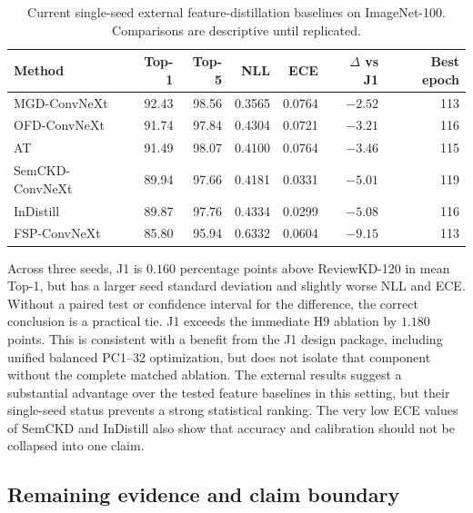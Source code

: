 \begin{table}[H]
\centering
\caption{Current single-seed external feature-distillation baselines on
ImageNet-100. Comparisons are descriptive until replicated.}
\label{tab:j1-external}
\small
\begin{tabular}{lrrrrrr}
\toprule
Method & Top-1 & Top-5 & NLL & ECE & $\Delta$ vs J1 & Best epoch\\
\midrule
MGD-ConvNeXt    & 92.43 & 98.56 & 0.3565 & 0.0764 & $-2.52$ & 113\\
\midrule
OFD-ConvNeXt    & 91.74 & 97.84 & 0.4304 & 0.0721 & $-3.21$ & 116\\
\midrule
AT              & 91.49 & 98.07 & 0.4100 & 0.0764 & $-3.46$ & 115\\
\midrule
SemCKD-ConvNeXt & 89.94 & 97.66 & 0.4181 & 0.0331 & $-5.01$ & 119\\
\midrule
InDistill       & 89.87 & 97.76 & 0.4334 & 0.0299 & $-5.08$ & 116\\
\midrule
FSP-ConvNeXt    & 85.80 & 95.94 & 0.6332 & 0.0604 & $-9.15$ & 113\\
\bottomrule
\end{tabular}
\end{table}

Across three seeds, J1 is $0.160$ percentage points above ReviewKD-120 in mean
Top-1, but has a larger seed standard deviation and slightly worse NLL and ECE.
Without a paired test or confidence interval for the difference, the correct
conclusion is a practical tie. J1 exceeds the immediate H9 ablation by
$1.180$ points. This is consistent with a benefit from the J1 design package,
including unified balanced PC1--32 optimization, but does not isolate that
component without the complete matched ablation. The external results suggest
a substantial advantage over the tested feature baselines in this setting, but
their single-seed status prevents a strong statistical ranking. The very low
ECE values of SemCKD and InDistill also show that accuracy and calibration
should not be collapsed into one claim.

\subsection{Remaining evidence and claim boundary}


